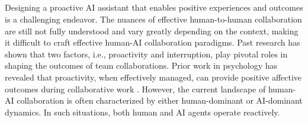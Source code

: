 \subsection{}
Designing a proactive AI assistant that enables positive experiences and outcomes is a challenging endeavor. The nuances of effective human-to-human collaboration are still not fully understood and vary greatly depending on the context, making it difficult to craft effective human-AI collaboration paradigms. 
Past research has shown that two factors, i.e., proactivity and interruption, play pivotal roles in shaping the outcomes of team collaborations. 
Prior work in psychology has revealed that proactivity, when effectively managed, can provide positive affective outcomes during collaborative work \cite{kim2020psychological}. However, the current landscape of human-AI collaboration is often characterized by either human-dominant or AI-dominant dynamics. 
In such situations, both human and AI agents operate reactively. 


